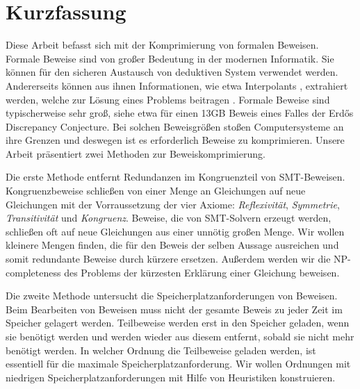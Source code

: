 \chapter*{Kurzfassung}

Diese Arbeit befasst sich mit der Komprimierung von formalen Beweisen.
Formale Beweise sind von gro{\ss}er Bedeutung in der modernen Informatik.
Sie k\"onnen f\"ur den sicheren Austausch von deduktiven System verwendet werden.
Andererseits k\"onnen aus ihnen Informationen, wie etwa Interpolants \cite{McMill2005}, extrahiert werden, welche zur L\"osung eines Problems beitragen \cite{Hofferek2013}.
Formale Beweise sind typischerweise sehr gro{\ss}, siehe etwa \cite{Konev2014} f\"ur einen 13GB Beweis eines Falles der Erd\H{o}s Discrepancy Conjecture.
Bei solchen Beweisgr\"o{\ss}en sto{\ss}en Computersysteme an ihre Grenzen und deswegen ist es erforderlich Beweise zu komprimieren.
Unsere Arbeit pr\"asentiert zwei Methoden zur Beweiskomprimierung.

Die erste Methode entfernt Redundanzen im Kongruenzteil von SMT-Beweisen.
Kongruenzbeweise schlie{\ss}en von einer Menge an Gleichungen auf neue Gleichungen mit der Vorraussetzung der vier Axiome: \emph{Reflexivit\"at}, \emph{Symmetrie}, \emph{Transitivit\"at} und \emph{Kongruenz}.
Beweise, die von SMT-Solvern erzeugt werden, schlie{\ss}en oft auf neue Gleichungen aus einer unn\"otig gro{\ss}en Menge.
Wir wollen kleinere Mengen finden, die f\"ur den Beweis der selben Aussage ausreichen und somit redundante Beweise durch k\"urzere ersetzen.
Au{\ss}erdem werden wir die NP-completeness des Problems der k\"urzesten Erkl\"arung einer Gleichung beweisen.

Die zweite Methode untersucht die Speicherplatzanforderungen von Beweisen.
Beim Bearbeiten von Beweisen muss nicht der gesamte Beweis zu jeder Zeit im Speicher gelagert werden.
Teilbeweise werden erst in den Speicher geladen, wenn sie ben\"otigt werden und werden wieder aus diesem entfernt, sobald sie nicht mehr ben\"otigt werden.
In welcher Ordnung die Teilbeweise geladen werden, ist essentiell f\"ur die maximale Speicherplatzanforderung.
Wir wollen Ordnungen mit niedrigen Speicherplatzanforderungen mit Hilfe von Heuristiken konstruieren.